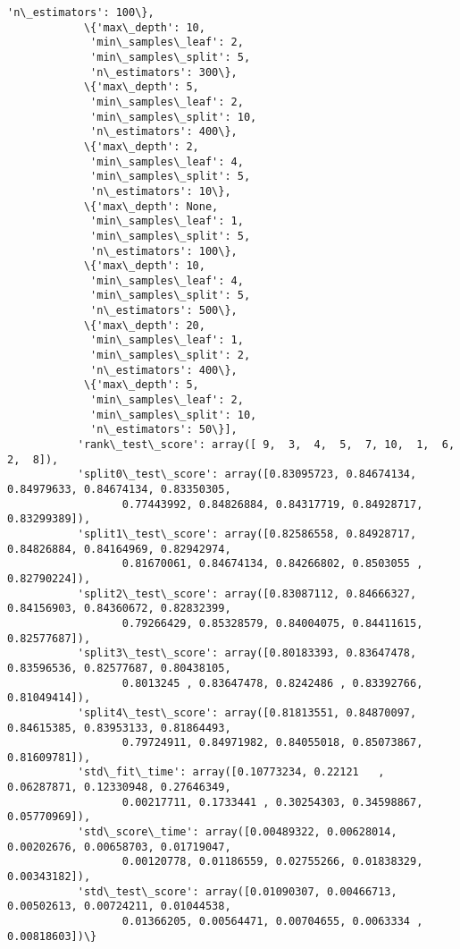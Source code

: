 \documentclass[11pt]{article}
\begin{document}
\begin{Verbatim}[commandchars=\\\{\}]
             'n\_estimators': 100\},
            \{'max\_depth': 10,
             'min\_samples\_leaf': 2,
             'min\_samples\_split': 5,
             'n\_estimators': 300\},
            \{'max\_depth': 5,
             'min\_samples\_leaf': 2,
             'min\_samples\_split': 10,
             'n\_estimators': 400\},
            \{'max\_depth': 2,
             'min\_samples\_leaf': 4,
             'min\_samples\_split': 5,
             'n\_estimators': 10\},
            \{'max\_depth': None,
             'min\_samples\_leaf': 1,
             'min\_samples\_split': 5,
             'n\_estimators': 100\},
            \{'max\_depth': 10,
             'min\_samples\_leaf': 4,
             'min\_samples\_split': 5,
             'n\_estimators': 500\},
            \{'max\_depth': 20,
             'min\_samples\_leaf': 1,
             'min\_samples\_split': 2,
             'n\_estimators': 400\},
            \{'max\_depth': 5,
             'min\_samples\_leaf': 2,
             'min\_samples\_split': 10,
             'n\_estimators': 50\}],
           'rank\_test\_score': array([ 9,  3,  4,  5,  7, 10,  1,  6,  2,  8]),
           'split0\_test\_score': array([0.83095723, 0.84674134, 0.84979633, 0.84674134, 0.83350305,
                  0.77443992, 0.84826884, 0.84317719, 0.84928717, 0.83299389]),
           'split1\_test\_score': array([0.82586558, 0.84928717, 0.84826884, 0.84164969, 0.82942974,
                  0.81670061, 0.84674134, 0.84266802, 0.8503055 , 0.82790224]),
           'split2\_test\_score': array([0.83087112, 0.84666327, 0.84156903, 0.84360672, 0.82832399,
                  0.79266429, 0.85328579, 0.84004075, 0.84411615, 0.82577687]),
           'split3\_test\_score': array([0.80183393, 0.83647478, 0.83596536, 0.82577687, 0.80438105,
                  0.8013245 , 0.83647478, 0.8242486 , 0.83392766, 0.81049414]),
           'split4\_test\_score': array([0.81813551, 0.84870097, 0.84615385, 0.83953133, 0.81864493,
                  0.79724911, 0.84971982, 0.84055018, 0.85073867, 0.81609781]),
           'std\_fit\_time': array([0.10773234, 0.22121   , 0.06287871, 0.12330948, 0.27646349,
                  0.00217711, 0.1733441 , 0.30254303, 0.34598867, 0.05770969]),
           'std\_score\_time': array([0.00489322, 0.00628014, 0.00202676, 0.00658703, 0.01719047,
                  0.00120778, 0.01186559, 0.02755266, 0.01838329, 0.00343182]),
           'std\_test\_score': array([0.01090307, 0.00466713, 0.00502613, 0.00724211, 0.01044538,
                  0.01366205, 0.00564471, 0.00704655, 0.0063334 , 0.00818603])\}
\end{Verbatim}
            
\end{document}
